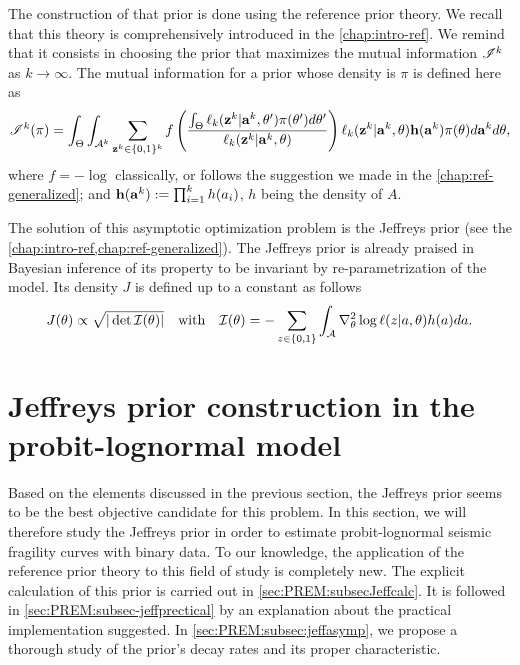 The construction of that prior is done using the reference prior theory.
We recall that this theory is comprehensively introduced in the \cref{chap:intro-ref}. %
We remind that it consists in choosing the prior that maximizes the mutual information $\mathscr{I}^k$ as $k\to\infty$. The mutual information for a prior whose density is $\pi$ is defined here as
    \begin{equation}
        \mathscr{I}^k(\pi) = \int_{\Theta}\int_{\mathcal{A}^k}\sum_{\mathbf{z}^k\in\{0,1\}^k}f\left(\frac{\int_\Theta\ell_k(\mathbf{z}^k|\mathbf{a}^k,\theta')\pi(\theta')d\theta'  }{\ell_k(\mathbf{z}^k|\mathbf{a}^k,\theta)}\right)\ell_k(\mathbf{z}^k|\mathbf{a}^k,\theta)\mathbf{h}(\mathbf{a}^k) \pi(\theta)d\mathbf{a}^kd\theta  ,
    \end{equation}
where $f=-\log$ classically, or follows the suggestion we made in the  \cref{chap:ref-generalized}; and $\mathbf{h}(\mathbf{a}^k):=\prod_{i=1}^kh(a_i) $, $h$ being the density of $A$.

The solution of this asymptotic optimization problem is the Jeffreys prior (see the \cref{chap:intro-ref,chap:ref-generalized}). The Jeffreys prior is already praised in Bayesian inference of its property to be invariant by re-parametrization of the model. Its density $J$ is defined up to a constant as follows
    \begin{equation}\label{eq:PREM:JcI}
        J(\theta)\propto \sqrt{|\det\mathcal{I}(\theta)|}\quad \text{with}\quad \mathcal{I}(\theta)= -\sum_{z\in\{0,1\}}\int_{\mathcal{A}} \nabla^2_\theta\log\ell(z|a,\theta)h(a)da.
    \end{equation}









\section{Jeffreys prior construction in the probit-lognormal model}\label{sec:PREM:Jeffreys}


Based on the elements discussed in the previous section, the Jeffreys prior seems to be the best objective candidate for this problem. In this section, we will therefore study the Jeffreys prior in order to estimate probit-lognormal seismic fragility curves with binary data. To our knowledge, the application of the reference prior theory to this field of study is completely new. The explicit calculation of this prior is carried out in \cref{sec:PREM:subsecJeffcalc}. It is followed in \cref{sec:PREM:subsec-jeffprectical} by an explanation about the practical implementation suggested.
In \cref{sec:PREM:subsec:jeffasymp}, we propose a thorough study of the prior's decay rates and its proper characteristic. %
%


